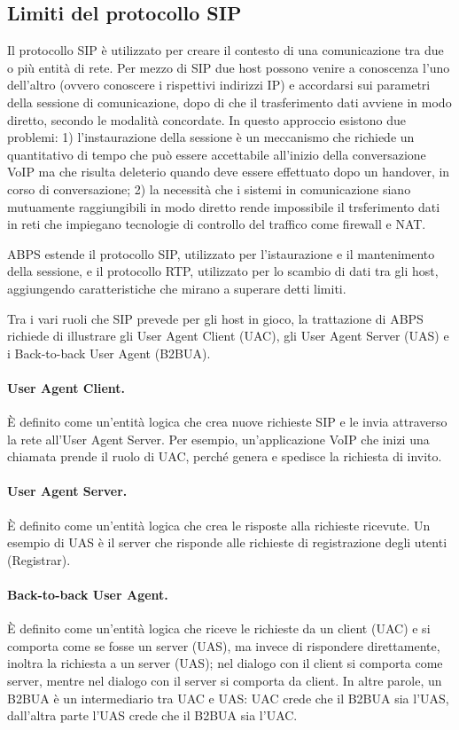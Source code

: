 \documentclass[12pt,a4paper,openright,twoside]{book}
\begin{document}
\subsection{Limiti del protocollo SIP}

Il protocollo SIP è utilizzato per creare il contesto di una
comunicazione tra due o più entità di rete. Per mezzo di SIP due host
possono venire a conoscenza l'uno dell'altro (ovvero conoscere i
rispettivi indirizzi IP) e accordarsi sui parametri della sessione di
comunicazione, dopo di che il trasferimento dati avviene in modo
diretto, secondo le modalità concordate. In questo approccio esistono
due problemi: 1) l'instaurazione della sessione è un meccanismo che
richiede un quantitativo di tempo che può essere accettabile
all'inizio della conversazione VoIP ma che risulta deleterio quando
deve essere effettuato dopo un handover, in corso di conversazione; 2)
la necessità che i sistemi in comunicazione siano mutuamente
raggiungibili in modo diretto rende impossibile il trsferimento dati
in reti che impiegano tecnologie di controllo del traffico come
firewall e NAT.

ABPS estende il protocollo SIP, utilizzato per l'istaurazione e il
mantenimento della sessione, e il protocollo RTP, utilizzato per lo
scambio di dati tra gli host, aggiungendo caratteristiche che mirano a
superare detti limiti.

Tra i vari ruoli che SIP prevede per gli host in gioco, la trattazione
di ABPS richiede di illustrare gli User Agent Client (UAC), gli User
Agent Server (UAS) e i Back-to-back User Agent (B2BUA).

\paragraph{User Agent Client.}
È definito come un'entità logica che crea nuove richieste SIP e le
invia attraverso la rete all'User Agent Server. Per esempio,
un'applicazione VoIP che inizi una chiamata prende il ruolo di UAC,
perché genera e spedisce la richiesta di invito.

\paragraph{User Agent Server.}
È definito come un'entità logica che crea le risposte alla richieste
ricevute. Un esempio di UAS è il server che risponde alle richieste di
registrazione degli utenti (Registrar).

\paragraph{Back-to-back User Agent.}
È definito come un'entità logica che riceve le richieste da un client
(UAC) e si comporta come se fosse un server (UAS), ma invece di
rispondere direttamente, inoltra la richiesta a un server (UAS); nel
dialogo con il client si comporta come server, mentre nel dialogo con
il server si comporta da client. In altre parole, un B2BUA è un
intermediario tra UAC e UAS: UAC crede che il B2BUA sia l'UAS,
dall'altra parte l'UAS crede che il B2BUA sia l'UAC.
\end{document}
